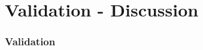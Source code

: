 \section{Validation - Discussion}
 

\begin{frame}
 \frametitle{Validation}
 \framesubtitle{}
 \label{ch4:validation}

\end{frame}
\note{}



